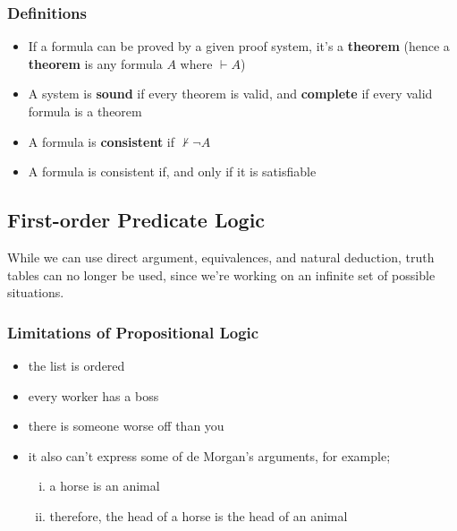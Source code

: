 \documentclass[a4paper, 12pt]{article}
\begin{document}
            \subsubsection*{Definitions}
                \begin{itemize}
                    \itemsep0em
                    \item If a formula can be proved by a given proof system, it's a \textbf{theorem} (hence a \textbf{theorem} is any formula $A$ where $\vdash A$)
                    \item A system is \textbf{sound} if every theorem is valid, and \textbf{complete} if every valid formula is a theorem
                    \item A formula is \textbf{consistent} if $\nvdash \neg A$
                    \item A formula is consistent if, and only if it is satisfiable
                \end{itemize}
        \subsection*{First-order Predicate Logic}
            While we can use direct argument, equivalences, and natural deduction, truth tables can no longer be used, since we're working on an infinite set of possible situations.
            \subsubsection*{Limitations of Propositional Logic}
                \begin{itemize}
                    \itemsep0em
                    \item the list is ordered
                    \item every worker has a boss
                    \item there is someone worse off than you
                    \item it also can't express some of de Morgan's arguments, for example;
                        \begin{enumerate}[i.]
                            \item a horse is an animal
                            \item therefore, the head of a horse is the head of an animal
                        \end{enumerate}
                \end{itemize}
\end{document}

